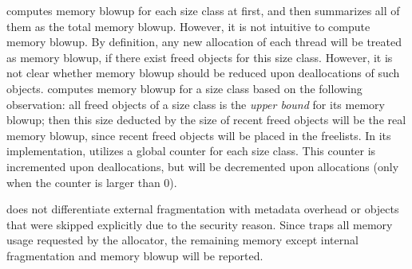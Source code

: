 \MP{} computes memory blowup for each size class at first, and then summarizes all of them as the total memory blowup. However, it is not intuitive to compute memory blowup. By definition, any new allocation of each thread will be treated as memory blowup, if there exist freed objects for this size class. However, it is not clear whether memory blowup should be reduced upon deallocations of such objects. \MP{} computes memory blowup for a size class based on the following observation: all freed objects of a size class is the \textit{upper bound} for its memory blowup; then this size deducted by the size of recent freed objects will be the real memory blowup, since recent freed objects will be placed in the freelists. In its implementation, \MP{} utilizes a global counter for each size class. This counter is incremented upon deallocations, but will be decremented upon allocations (only when the counter is larger than 0).  

 
 \MP{} does not differentiate external fragmentation with metadata overhead or objects that were skipped explicitly due to the security reason. Since \MP{} traps all memory usage requested by the allocator, the remaining memory except internal fragmentation and memory blowup will be reported. 
 

 


  
 

